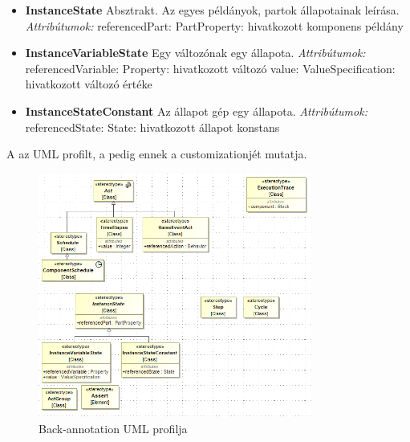 \begin{itemize}
	\item \textbf{InstanceState} \newline
	Absztrakt. Az egyes példányok, partok állapotainak leírása.
	\newline
	\textit{Attribútumok:}
	\subitem referencedPart: PartProperty: hivatkozott komponens példány
	
	\item \textbf{InstanceVariableState} \newline
	Egy változónak egy állapota.
	\newline
	\textit{Attribútumok:}
	\subitem referencedVariable: Property: hivatkozott változó
	\subitem value: ValueSpecification: hivatkozott változó értéke
	
	\item \textbf{InstanceStateConstant} \newline
	Az állapot gép egy állapota.
	\newline
	\textit{Attribútumok:}
	\subitem referencedState: State: hivatkozott állapot konstans
\end{itemize}

A  az UML profilt, a  pedig ennek a customizationjét mutatja.

\begin{figure}[!ht]
	\centering
	\includegraphics[width=90mm, keepaspectratio]{figures/contribution/trace-model.png}
	\caption{Back-annotation UML profilja}
	\label{fig:contribution-trace-profile}
\end{figure}

